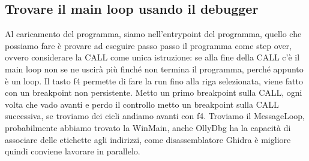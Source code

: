\documentclass[12pt, oneside]{extbook}
\begin{document}
\subsection{Trovare il main loop usando il debugger}
Al caricamento del programma, siamo nell'entrypoint del programma, quello che possiamo fare è provare ad eseguire passo passo il programma come step over, ovvero considerare la CALL come unica istruzione: se alla fine della CALL c'è il main loop non se ne uscirà più finché non termina il programma, perché appunto è un loop. Il tasto f4 permette di fare la run fino alla riga selezionata, viene fatto con un breakpoint non persistente. Metto un primo breakpoint sulla CALL, ogni volta che vado avanti e perdo il controllo metto un breakpoint sulla CALL successiva, se troviamo dei cicli andiamo avanti con f4. Troviamo il MessageLoop, probabilmente abbiamo trovato la WinMain, anche OllyDbg ha la capacità di associare delle etichette agli indirizzi, come disassemblatore Ghidra è migliore quindi conviene lavorare in parallelo.
\end{document}
